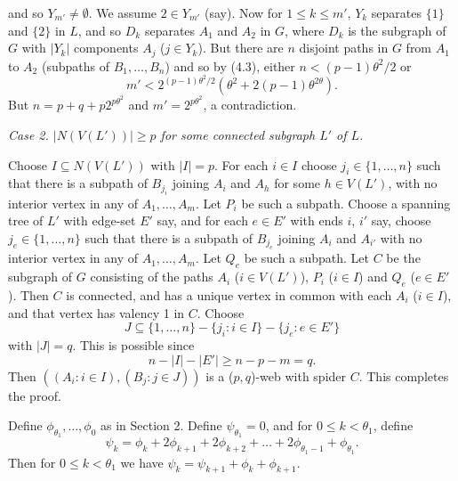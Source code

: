 \noindent and so $Y_{m'} \ne \emptyset$. We assume $2 \in Y_{m'}$ (say). Now for $1 \le k \le m'$, $Y_k$ separates $\{1\}$ and $\{2\}$ in $L$, and so $D_k$ separates $A_1$ and $A_2$ in $G$, where $D_k$ is the subgraph of $G$ with $|Y_k|$ components $A_j$ ($j \in Y_k$). But there are $n$ disjoint paths in $G$ from $A_1$ to $A_2$ (subpaths of $B_1, \dots, B_n$) and so by (4.3), either $n < (p - 1)\theta^2/2$ or
\begin{equation*}
m' < 2^{(p-1)\theta^2/2}(\theta^2 + 2(p-1)\theta^{2\theta}).
\end{equation*}
But $n = p + q + p 2^{p\theta^2}$ and $m' = 2^{p\theta^2}$, a contradiction.

\textit{Case 2. $|N(V(L'))| \ge p$ for some connected subgraph $L'$ of $L$.}

Choose $I \subseteq N(V(L'))$ with $|I| = p$. For each $i \in I$ choose $j_i \in \{1, \dots, n\}$ such that there is a subpath of $B_{j_i}$ joining $A_i$ and $A_h$ for some $h \in V(L')$, with no interior vertex in any of $A_1, \dots, A_m$. Let $P_i$ be such a subpath. Choose a spanning tree of $L'$ with edge-set $E'$ say, and for each $e \in E'$ with ends $i$, $i'$ say, choose $j_e \in \{1, \dots, n\}$ such that there is a subpath of $B_{j_e}$ joining $A_i$ and $A_{i'}$ with no interior vertex in any of $A_1, \dots, A_m$. Let $Q_e$ be such a subpath. Let $C$ be the subgraph of $G$ consisting of the paths $A_i$ ($i \in V(L')$), $P_i$ ($i \in I$) and $Q_e$ ($e \in E'$). Then $C$ is connected, and has a unique vertex in common with each $A_i$ ($i \in I$), and that vertex has valency 1 in $C$. Choose
\begin{equation*}
J \subseteq \{1, \dots, n\} - \{j_i \colon i \in I\} - \{j_e \colon e \in E'\}
\end{equation*}
with $|J| = q$. This is possible since
\begin{equation*}
n - |I| - |E'| \ge n - p - m = q.
\end{equation*}
Then $((A_i \colon i \in I), (B_j \colon j \in J))$ is a ($p, q$)-web with spider $C$. This completes the proof.

Define $\phi_{\theta_1}, \dots, \phi_0$ as in Section 2. Define $\psi_{\theta_1} = 0$, and for $0 \le k < \theta_1$, define
\begin{equation*}
\psi_k = \phi_k + 2\phi_{k+1} + 2\phi_{k+2} + \dots + 2\phi_{\theta_1 - 1} + \phi_{\theta_1}.
\end{equation*}
Then for $0 \le k < \theta_1$ we have $\psi_k = \psi_{k+1} + \phi_k + \phi_{k+1}$.

